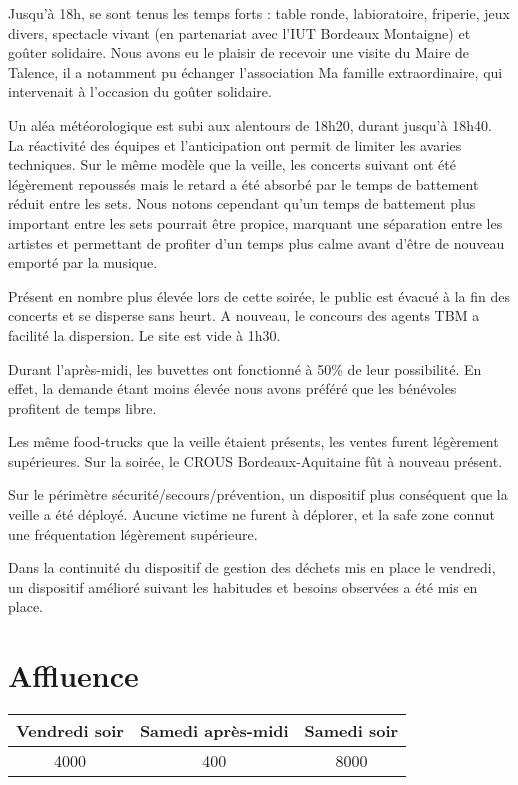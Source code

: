 \documentclass[12pt,a4paper]{report}
\begin{document}
Jusqu'à 18h, se sont tenus les temps forts : table ronde, labioratoire, friperie, jeux divers, spectacle vivant (en partenariat avec l'IUT Bordeaux Montaigne) et goûter solidaire. Nous avons eu le plaisir de recevoir une visite du Maire de Talence, il a notamment pu échanger l'association Ma famille extraordinaire, qui intervenait à l'occasion du goûter solidaire.

Un aléa météorologique est subi aux alentours de 18h20, durant jusqu'à 18h40. La réactivité des équipes et l'anticipation ont permit de limiter les avaries techniques. Sur le même modèle que la veille, les concerts suivant ont été légèrement repoussés mais le retard a été absorbé par le temps de battement réduit entre les sets. Nous notons cependant qu'un temps de battement plus important entre les sets pourrait être propice, marquant une séparation entre les artistes et permettant de profiter d'un temps plus calme avant d'être de nouveau emporté par la musique.

Présent en nombre plus élevée lors de cette soirée, le public est évacué à la fin des concerts et se disperse sans heurt. A nouveau, le concours des agents TBM a facilité la dispersion. Le site est vide à 1h30.

Durant l'après-midi, les buvettes ont fonctionné à 50\% de leur possibilité. En effet, la demande étant moins élevée nous avons préféré que les bénévoles profitent de temps libre. 

Les même food-trucks que la veille étaient présents, les ventes furent légèrement supérieures. 
Sur la soirée, le CROUS Bordeaux-Aquitaine fût à nouveau présent.

Sur le périmètre sécurité/secours/prévention, un dispositif plus conséquent que la veille a été déployé. Aucune victime ne furent à déplorer, et la safe zone connut une fréquentation légèrement supérieure. 

Dans la continuité du dispositif de gestion des déchets mis en place le vendredi, un dispositif amélioré suivant les habitudes et besoins observées a été mis en place.

\section{Affluence}
\begin{center}
\begin{tabular}{|c|c|c|}
Vendredi soir & Samedi après-midi & Samedi soir \\
\hline
4000 & 400 & 8000\\
\end{tabular}
\end{center}
\end{document}
